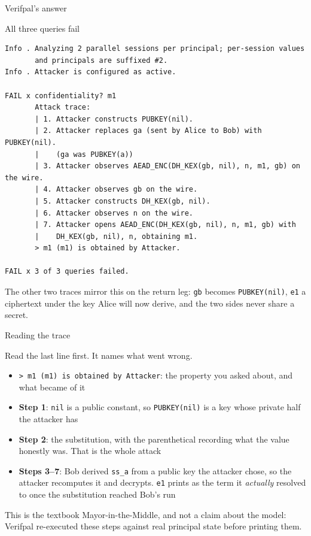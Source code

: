 \ifdefined\PRESENTATION\else\PassOptionsToClass{handout}{beamer}\fi\documentclass[aspectratio=169, lualatex]{beamer}
\newcommand{\vpcode}{\fontsize{6}{6.4}\selectfont\ttfamily\color{vpink}}
\begin{document}
\begin{frame}[fragile]{Verifpal's answer}
	\begin{vpresult}{All three queries fail}
		\begin{lstlisting}[basicstyle=\vpcode]
Info . Analyzing 2 parallel sessions per principal; per-session values
       and principals are suffixed #2.
Info . Attacker is configured as active.

FAIL x confidentiality? m1
       Attack trace:
       | 1. Attacker constructs PUBKEY(nil).
       | 2. Attacker replaces ga (sent by Alice to Bob) with PUBKEY(nil).
       |    (ga was PUBKEY(a))
       | 3. Attacker observes AEAD_ENC(DH_KEX(gb, nil), n, m1, gb) on the wire.
       | 4. Attacker observes gb on the wire.
       | 5. Attacker constructs DH_KEX(gb, nil).
       | 6. Attacker observes n on the wire.
       | 7. Attacker opens AEAD_ENC(DH_KEX(gb, nil), n, m1, gb) with
       |    DH_KEX(gb, nil), n, obtaining m1.
       > m1 (m1) is obtained by Attacker.

FAIL x 3 of 3 queries failed.
\end{lstlisting}
	\end{vpresult}
	\vspace{0.3em}
	\begin{center}
		\small The other two traces mirror this on the return leg: \texttt{gb} becomes \texttt{PUBKEY(nil)}, \texttt{e1} a ciphertext under the key Alice will now derive, and the two sides never share a secret.
	\end{center}
\end{frame}

\begin{frame}{Reading the trace}
	\begin{center}
		\Large
		Read the last line first. It names what went wrong.
	\end{center}
	\vspace{-0.5em}
	\begin{itemize}
		\item \texttt{> m1 (m1) is obtained by Attacker}: the property you asked about, and what became of it
		\item \textbf{Step 1}: \texttt{nil} is a public constant, so \texttt{PUBKEY(nil)} is a key whose private half the attacker has
		\item \textbf{Step 2}: the substitution, with the parenthetical recording what the value honestly was. That is the whole attack
		\item \textbf{Steps 3--7}: Bob derived \texttt{ss\_a} from a public key the attacker chose, so the attacker recomputes it and decrypts. \texttt{e1} prints as the term it \textit{actually} resolved to once the substitution reached Bob's run
	\end{itemize}
	\vspace{0.2em}
	\begin{center}
		\small
		This is the textbook Mayor-in-the-Middle, and not a claim about the model: Verifpal re-executed these steps against real principal state before printing them.
	\end{center}
\end{frame}
\end{document}
